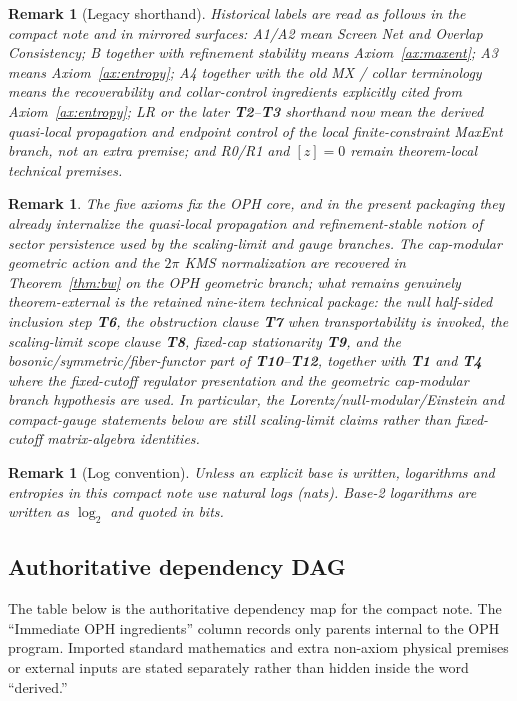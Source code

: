 \documentclass[11pt]{article}
\newtheorem{remark}[theorem]{Remark}
\begin{document}
\begin{remark}[Legacy shorthand]
Historical labels are read as follows in the compact note and in mirrored surfaces: A1/A2 mean Screen Net and Overlap Consistency; B together with refinement stability means Axiom~\ref{ax:maxent}; A3 means Axiom~\ref{ax:entropy}; A4 together with the old MX / collar terminology means the recoverability and collar-control ingredients explicitly cited from Axiom~\ref{ax:entropy}; LR or the later \textbf{T2}--\textbf{T3} shorthand now mean the derived quasi-local propagation and endpoint control of the local finite-constraint MaxEnt branch, not an extra premise; and R0/R1 and \([z]=0\) remain theorem-local technical premises.
\end{remark}

\begin{remark}
The five axioms fix the OPH core, and in the present packaging they already internalize the quasi-local propagation and refinement-stable notion of sector persistence used by the scaling-limit and gauge branches. The cap-modular geometric action and the \(2\pi\) KMS normalization are recovered in Theorem~\ref{thm:bw} on the OPH geometric branch; what remains genuinely theorem-external is the retained nine-item technical package: the null half-sided inclusion step \textbf{T6}, the obstruction clause \textbf{T7} when transportability is invoked, the scaling-limit scope clause \textbf{T8}, fixed-cap stationarity \textbf{T9}, and the bosonic/symmetric/fiber-functor part of \textbf{T10}--\textbf{T12}, together with \textbf{T1} and \textbf{T4} where the fixed-cutoff regulator presentation and the geometric cap-modular branch hypothesis are used. In particular, the Lorentz/null-modular/Einstein and compact-gauge statements below are still scaling-limit claims rather than fixed-cutoff matrix-algebra identities.
\end{remark}

\begin{remark}[Log convention]
Unless an explicit base is written, logarithms and entropies in this compact note use natural logs (nats). Base-2 logarithms are written as \(\log_2\) and quoted in bits.
\end{remark}

\subsection*{Authoritative dependency DAG}

The table below is the authoritative dependency map for the compact note. The ``Immediate OPH ingredients'' column records only parents internal to the OPH program. Imported standard mathematics and extra non-axiom physical premises or external inputs are stated separately rather than hidden inside the word ``derived.''
\end{document}
